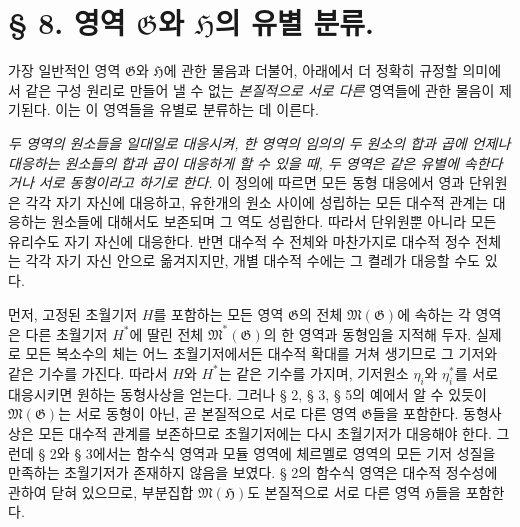 
\section*{§ 8. 영역 $\mathfrak G$와 $\mathfrak H$의 유별 분류.}

가장 일반적인 영역 $\mathfrak G$와 $\mathfrak H$에 관한 물음과 더불어, 아래에서 더 정확히 규정할 의미에서 같은 구성 원리로 만들어 낼 수 없는 \emph{본질적으로 서로 다른} 영역들에 관한 물음이 제기된다. 이는 이 영역들을 유별로 분류하는 데 이른다.

\emph{두 영역의 원소들을 일대일로 대응시켜, 한 영역의 임의의 두 원소의 합과 곱에 언제나 대응하는 원소들의 합과 곱이 대응하게 할 수 있을 때, 두 영역은 같은 유별에 속한다거나 서로 동형이라고 하기로 한다.} 이 정의에 따르면 모든 동형 대응에서 영과 단위원은 각각 자기 자신에 대응하고, 유한개의 원소 사이에 성립하는 모든 대수적 관계는 대응하는 원소들에 대해서도 보존되며 그 역도 성립한다. 따라서 단위원뿐 아니라 모든 유리수도 자기 자신에 대응한다. 반면 대수적 수 전체와 마찬가지로 대수적 정수 전체는 각각 자기 자신 안으로 옮겨지지만, 개별 대수적 수에는 그 켤레가 대응할 수도 있다.

먼저, 고정된 초월기저 $H$를 포함하는 모든 영역 $\mathfrak G$의 전체 $\mathfrak M(\mathfrak G)$에 속하는 각 영역은 다른 초월기저 $H^*$에 딸린 전체 $\mathfrak M^*(\mathfrak G)$의 한 영역과 동형임을 지적해 두자. 실제로 모든 복소수의 체는 어느 초월기저에서든 대수적 확대를 거쳐 생기므로 그 기저와 같은 기수를 가진다. 따라서 $H$와 $H^*$는 같은 기수를 가지며, 기저원소 $\eta_i$와 $\eta_i^*$를 서로 대응시키면 원하는 동형사상을 얻는다. 그러나 § 2, § 3, § 5의 예에서 알 수 있듯이 $\mathfrak M(\mathfrak G)$는 서로 동형이 아닌, 곧 본질적으로 서로 다른 영역 $\mathfrak G$들을 포함한다. 동형사상은 모든 대수적 관계를 보존하므로 초월기저에는 다시 초월기저가 대응해야 한다. 그런데 § 2와 § 3에서는 함수식 영역과 모듈 영역에 체르멜로 영역의 모든 기저 성질을 만족하는 초월기저가 존재하지 않음을 보였다. § 2의 함수식 영역은 대수적 정수성에 관하여 닫혀 있으므로, 부분집합 $\mathfrak M(\mathfrak H)$도 본질적으로 서로 다른 영역 $\mathfrak H$들을 포함한다.

